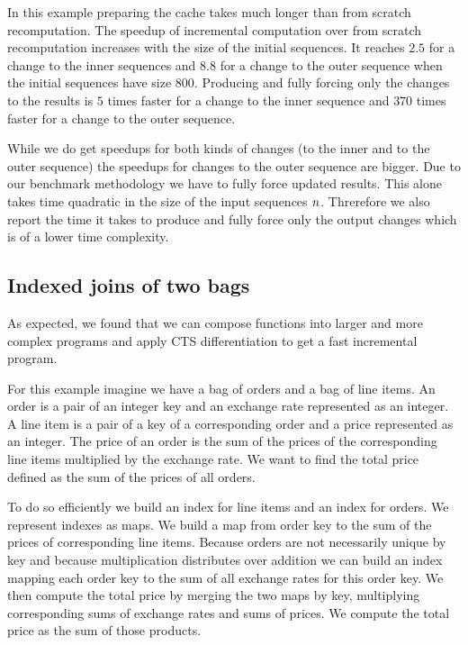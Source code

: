 In this example preparing the cache takes much longer than from scratch
recomputation. The speedup of incremental computation over from scratch
recomputation increases with the size of the initial sequences. It reaches
\ensuremath{\mathrm{2.5}} for a change to the inner sequences and \ensuremath{\mathrm{8.8}} for a change to the outer
sequence when the initial sequences have size \ensuremath{\mathrm{800}}. Producing and fully forcing
only the changes to the results is \ensuremath{\mathrm{5}} times faster for a change to the inner
sequence and \ensuremath{\mathrm{370}} times faster for a change to the outer sequence.

While we do get speedups for both kinds of
changes (to the inner and to the outer sequence) the speedups for changes to the
outer sequence are bigger.
Due to our benchmark methodology we have to fully force updated results. This alone
takes time quadratic in the size of the input sequences \ensuremath{\Varid{n}}. Threrefore we also
report the time it takes to produce and fully force only the output changes which
is of a lower time complexity.


\subsection{Indexed joins of two bags}
\label{sec:incr-an-index}

As expected, we found that we can compose functions into larger and more complex programs and
apply CTS differentiation to get a fast incremental program.

For this example imagine we have a bag of orders and a bag of line items. An
order is a pair of an integer key and an exchange rate represented as an integer.
A line item is a pair of a key of a corresponding order and a price represented
as an integer. The price of an order is the sum of the prices of the
corresponding line items multiplied by the exchange rate. We want to find the
total price defined as the sum of the prices of all orders.

To do so efficiently we build an index for line items and an index for orders.
We represent indexes as maps. We build a map from order key to the sum of the
prices of corresponding line items. Because orders are not necessarily unique
by key and because multiplication distributes over addition we can build an index
mapping each order key to the sum of all exchange rates for this order key.
We then compute the total price by merging the two maps by key, multiplying
corresponding sums of exchange rates and sums of prices. We compute the total
price as the sum of those products.

